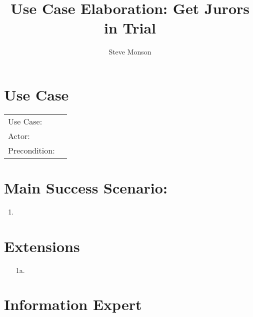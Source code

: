 \documentclass{article}
\title{Use Case Elaboration: Get Jurors in Trial}
\author{Steve Monson}
\begin{document}
\maketitle

\section*{Use Case}
\begin{tabular}{l l}
  Use Case:     & \\
  Actor:        & \\
  Precondition: & \\
\end{tabular}

\section*{Main Success Scenario:}
\begin{enumerate}
  \item 
\end{enumerate}

\section*{Extensions}
\begin{itemize}
  \item [1a.]

\end{itemize}

\section*{Information Expert}
\end{document}
